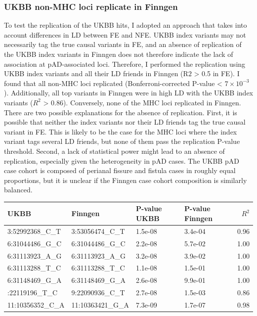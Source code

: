 \subsubsection{UKBB non-MHC loci replicate in Finngen}
To test the replication of the UKBB hits, I adopted an approach that takes into account differences in LD between FE and NFE. UKBB index variants may not necessarily tag the true causal variants in FE, and an absence of replication of the UKBB index variants in Finngen does not therefore indicate the lack of association at pAD-associated loci. Therefore, I performed the replication using UKBB index variants and all their LD friends in Finngen (R${2}$ > 0.5 in FE). I found that all non-MHC loci replicated (Bonferroni-corrected P-value < $7\times10^{-3}$). Additionally, all top variants in Finngen were in high LD with the UKBB index variants ($R^{2}$ > 0.86). Conversely, none of the MHC loci replicated in Finngen. There are two possible explanations for the absence of replication. First, it is possible that neither the index variants nor their LD friends tag the true causal variant in FE. This is likely to be the case for the MHC loci where the index variant tags several LD friends, but none of them pass the replication P-value threshold. Second, a lack of statistical power might lead to an absence of replication, especially given the heterogeneity in pAD cases. The UKBB pAD case cohort is composed of perianal fissure and fistula cases in roughly equal proportions, but it is unclear if the Finngen case cohort composition is similarly balanced. 

\begin{table}[H]
  \centering
  \begin{tabular}[t]{llllr}
  \toprule
  UKBB & Finngen & P-value UKBB & P-value Finngen & $R^{2}$\\
  \midrule
  3:52992368\_C\_T & 3:53056474\_C\_T & 1.5e-08 & 3.4e-04 & 0.96\\
  6:31044486\_G\_C & 6:31044486\_G\_C & 2.2e-08 & 5.7e-02 & 1.00\\
  6:31113923\_A\_G & 6:31113923\_A\_G & 3.2e-08 & 3.9e-02 & 1.00\\
  6:31113288\_T\_C & 6:31113288\_T\_C & 1.1e-08 & 1.5e-01 & 1.00\\
  6:31148469\_G\_A & 6:31148469\_G\_A & 2.6e-08 & 9.9e-01 & 1.00\\
  \addlinespace
  9:22119196\_T\_C & 9:22090936\_C\_T & 2.7e-08 & 1.5e-03 & 0.86\\
  11:10356352\_C\_A & 11:10363421\_G\_A & 7.3e-09 & 1.7e-07 & 0.98\\
  \bottomrule
  \end{tabular}
  \end{table}

